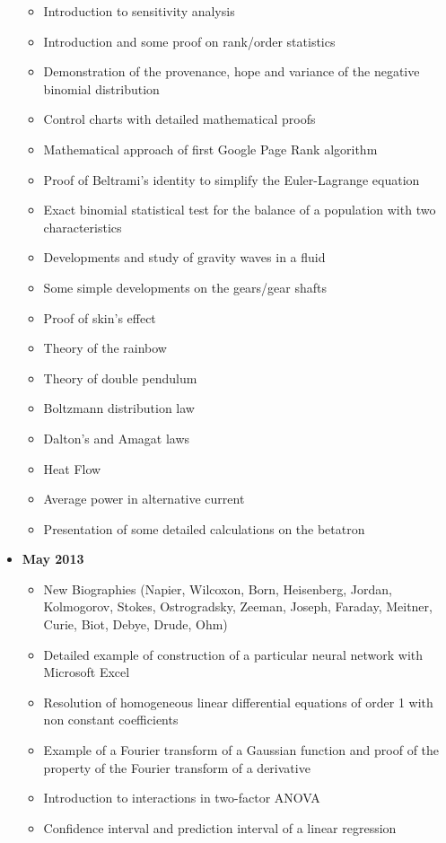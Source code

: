 \documentclass[12pt,a4paper,twoside,openright]{report}
\theoremstyle{definition}
\theoremstyle{itexmp}
\numberwithin{equation}{section}
\begin{document}
\begin{itemize}
\begin{itemize}[noitemsep]
			\item Introduction to sensitivity analysis
			\item Introduction and some proof on rank/order statistics
			\item Demonstration of the provenance, hope and variance of the negative binomial distribution
			\item Control charts with detailed mathematical proofs
			\item Mathematical approach of first Google Page Rank algorithm
			\item Proof of Beltrami's identity to simplify the Euler-Lagrange equation
			\item Exact binomial statistical test for the balance of a population with two characteristics
			\item Developments and study of gravity waves in a fluid
			\item Some simple developments on the gears/gear shafts
			\item Proof of skin's effect
			\item Theory of the rainbow
			\item Theory of double pendulum
			\item Boltzmann distribution law
			\item Dalton's and Amagat laws
			\item Heat Flow
			\item Average power in alternative current
			\item Presentation of some detailed calculations on the betatron
		\end{itemize}
	\item \textbf{May 2013}
		\begin{itemize}[noitemsep]
			\item New Biographies (Napier, Wilcoxon, Born, Heisenberg, Jordan, Kolmogorov, Stokes, Ostrogradsky, Zeeman, Joseph, Faraday, Meitner, Curie, Biot, Debye, Drude, Ohm)
			\item Detailed example of construction of a particular neural network with Microsoft Excel
			\item Resolution of homogeneous linear differential equations of order 1 with non constant coefficients
			\item Example of a Fourier transform of a Gaussian function and proof of the property of the Fourier transform of a derivative
			\item Introduction to interactions in two-factor ANOVA
			\item Confidence interval and prediction interval of a linear regression

\end{itemize}
\end{itemize}
\end{document}
